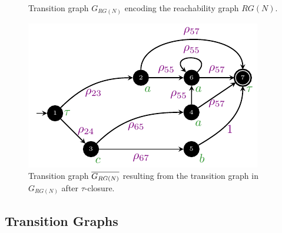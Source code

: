 \begin{figure}[!t]
\begin{minipage}{.49\textwidth}
	\caption{Transition graph $G_{RG(N)}$ encoding the reachability graph $RG(N)$.}\label{fig:lmc}\label{fig:orig}
\end{minipage}\hfill \begin{minipage}{.49\textwidth} \includegraphics[width=.9\textwidth]{images/closed_example.pdf}
	\caption{Transition graph $\overline{G_{RG(N)}}$ resulting from the transition graph in $G_{RG(N)}$ after $\tau$-closure.}\label{fig:closed}
\end{minipage}
\end{figure}




%
%



\subsection{Transition Graphs}\label{subsec:ppn}

